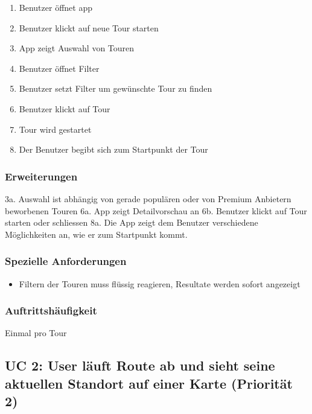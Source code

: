 \documentclass[a4paper,10pt,xetex]{article}
\begin{document}
\begin{enumerate}
\def\labelenumi{\arabic{enumi}.}
\tightlist
\item
  Benutzer öffnet app
\item
  Benutzer klickt auf neue Tour starten
\item
  App zeigt Auswahl von Touren
\item
  Benutzer öffnet Filter
\item
  Benutzer setzt Filter um gewünschte Tour zu finden
\item
  Benutzer klickt auf Tour
\item
  Tour wird gestartet
\item
  Der Benutzer begibt sich zum Startpunkt der Tour
\end{enumerate}

\subsubsection{Erweiterungen}\label{erweiterungen}

3a. Auswahl ist abhängig von gerade populären oder von Premium Anbietern
beworbenen Touren\newline
6a. App zeigt Detailvorschau an\newline
6b. Benutzer klickt auf Tour starten oder schliessen\newline
8a. Die App zeigt dem Benutzer verschiedene Möglichkeiten an, wie er zum
Startpunkt kommt.

\subsubsection{Spezielle Anforderungen}\label{spezielle-anforderungen}

\begin{itemize}
\tightlist
\item
  Filtern der Touren muss flüssig reagieren, Resultate werden sofort
  angezeigt
\end{itemize}

\subsubsection{Auftrittshäufigkeit}\label{auftrittshuxe4ufigkeit}

Einmal pro Tour

\subsection{UC 2: User läuft Route ab und sieht seine aktuellen Standort
auf einer Karte (Priorität
2)}\label{uc-2-user-luxe4uft-route-ab-und-sieht-seine-aktuellen-standort-auf-einer-karte-priorituxe4t-2}
\end{document}
